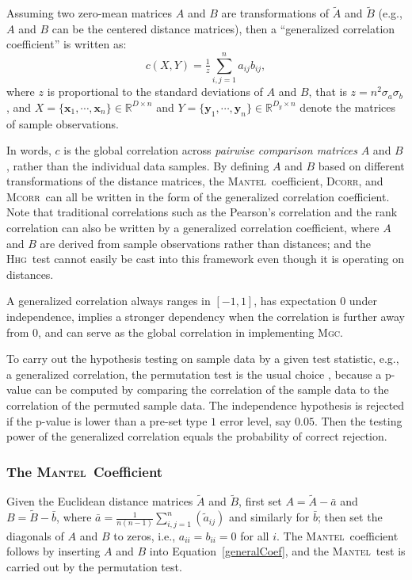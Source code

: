 \documentclass[11pt]{article}
\providecommand{\sct}[1]{{\normalfont\textsc{#1}}}
\providecommand{\mb}[1]{\boldsymbol{#1}}
\newcommand{\Real}{\mathbb{R}}
\newcommand{\GG}{c}
\newcommand{\Mgc}{\sct{Mgc}}
\newcommand{\Hhg}{\sct{Hhg}}
\newcommand{\Dcorr}{\sct{Dcorr}}
\newcommand{\Mcorr}{\sct{Mcorr}}
\newcommand{\Mantel}{\sct{Mantel}}
\begin{document}
Assuming two zero-mean matrices $A$ and $B$ are transformations of $\tilde{A}$ and $\tilde{B}$ (e.g., $A$ and $B$ can be the centered distance matrices),
then a ``generalized correlation coefficient''  \cite{Spearman1904,KendallBook} is written as:
\begin{equation}
\label{generalCoef}
\GG(X,Y)= \tfrac{1}{z} {\textstyle \sum_{i,j=1}^n a_{ij} b_{ij}},
\end{equation}
where $z$ is proportional to the standard deviations of $A$ and $B$, that is $z=n^2\sigma_a \sigma_b$, and $X=\{\mb{x}_{1},\cdots, \mb{x}_{n}\} \in \Real^{D \times n}$ and $Y=\{\mb{y}_{1},\cdots, \mb{y}_{n}\} \in \Real^{D_y \times n}$ denote the matrices of sample observations.

In words, $\GG$ is the global correlation across \emph{pairwise comparison matrices} $A$ and $B$, rather than the individual data samples. By defining $A$ and $B$ based on different transformations of 
the distance matrices, the \Mantel~coefficient, \Dcorr, and \Mcorr~can all be written in the form of the generalized correlation coefficient. Note that traditional correlations such as the Pearson's correlation and the rank correlation can also be written by a generalized correlation coefficient, where $A$ and $B$ are derived from sample observations rather than distances; and the \Hhg~test  cannot easily be cast into this framework even though it is operating on distances.

A generalized correlation always ranges in $[-1,1]$, has expectation $0$ under independence, implies a stronger dependency when the correlation is further away from $0$, and can serve as the global correlation in implementing \Mgc. 

To carry out the hypothesis testing on sample data by a given test statistic, e.g., a generalized correlation, the permutation test is the usual choice \cite{GoodPermutationBook}, because a p-value can be computed by comparing the correlation of the sample data to the correlation of the permuted sample data. The independence hypothesis is rejected if the p-value is lower than a pre-set type $1$ error level, say $0.05$. Then the testing power of the generalized correlation equals the probability of correct rejection.

\subsubsection{The \Mantel~Coefficient}
\label{appen:mantel}
Given the Euclidean distance matrices $\tilde{A}$ and $\tilde{B}$, first set $A=\tilde{A}-\bar{a}$ and $B=\tilde{B}-\bar{b}$, where $\bar{a}=\frac{1}{n(n-1)}\sum_{i,j=1}^{n}(\tilde{a}_{ij})$ and similarly for $\bar{b}$; then set the diagonals of $A$ and $B$ to zeros, i.e., $a_{ii}=b_{ii}=0$ for all $i$.
The \Mantel~coefficient \cite{Mantel1967} follows by inserting $A$ and $B$ into Equation~\ref{generalCoef},
and the \Mantel~test is carried out by the permutation test.
\end{document}
